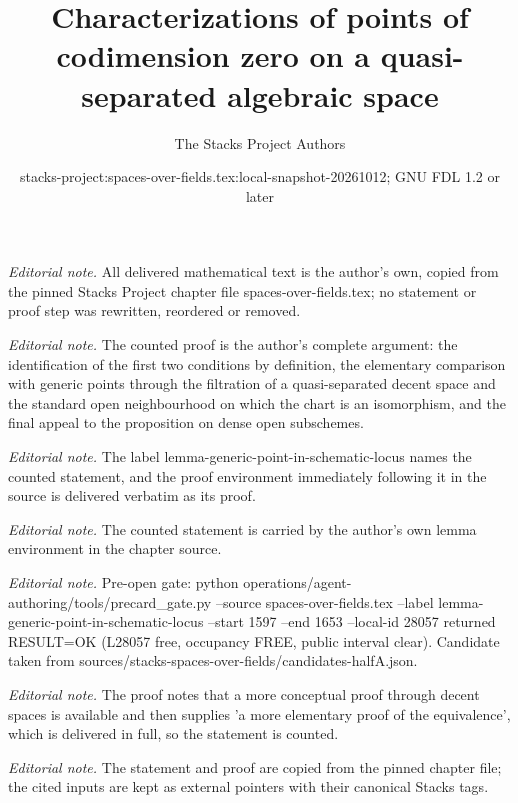 \documentclass[10pt,a4paper]{amsart}
\title{Characterizations of points of codimension zero on a quasi-separated algebraic space}
\author{The Stacks Project Authors}
\date{stacks-project:spaces-over-fields.tex:local-snapshot-20261012; GNU FDL 1.2 or later}
\theoremstyle{plain}
\theoremstyle{definition}
\theoremstyle{remark}
\numberwithin{equation}{subsection}
\begin{document}
\maketitle
\noindent\textit{Editorial note.} All delivered mathematical text is the author's own, copied from the pinned Stacks Project chapter file spaces-over-fields.tex; no statement or proof step was rewritten, reordered or removed.\par\medskip
\noindent\textit{Editorial note.} The counted proof is the author's complete argument: the identification of the first two conditions by definition, the elementary comparison with generic points through the filtration of a quasi-separated decent space and the standard open neighbourhood on which the chart is an isomorphism, and the final appeal to the proposition on dense open subschemes.\par\medskip
\noindent\textit{Editorial note.} The label lemma-generic-point-in-schematic-locus names the counted statement, and the proof environment immediately following it in the source is delivered verbatim as its proof.\par\medskip
\noindent\textit{Editorial note.} The counted statement is carried by the author's own lemma environment in the chapter source.\par\medskip
\noindent\textit{Editorial note.} Pre-open gate: python operations/agent-authoring/tools/precard\_gate.py --source spaces-over-fields.tex --label lemma-generic-point-in-schematic-locus --start 1597 --end 1653 --local-id 28057 returned RESULT=OK (L28057 free, occupancy FREE, public interval clear). Candidate taken from sources/stacks-spaces-over-fields/candidates-halfA.json.\par\medskip
\noindent\textit{Editorial note.} The proof notes that a more conceptual proof through decent spaces is available and then supplies 'a more elementary proof of the equivalence', which is delivered in full, so the statement is counted.\par\medskip
\noindent\textit{Editorial note.} The statement and proof are copied from the pinned chapter file; the cited inputs are kept as external pointers with their canonical Stacks tags.\par\medskip
\end{document}
